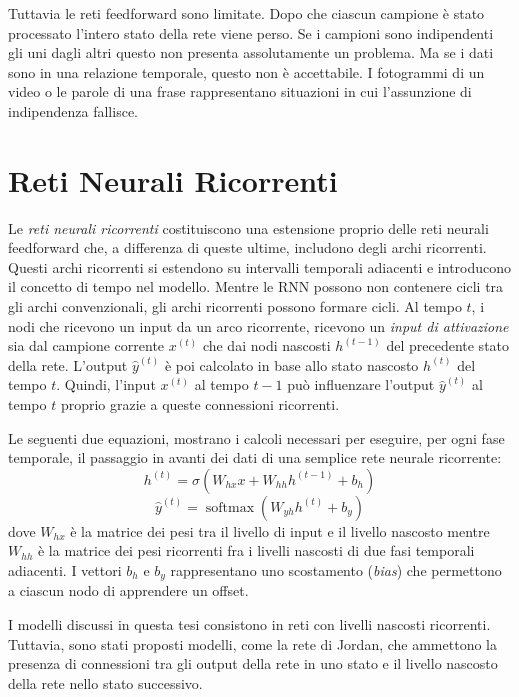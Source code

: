 Tuttavia le reti feedforward sono limitate. Dopo che ciascun campione \`e stato
processato l'intero stato della rete viene perso. Se i campioni sono indipendenti
gli uni dagli altri questo non presenta assolutamente un problema. Ma se i dati
sono in una relazione temporale, questo non \`e accettabile. I fotogrammi di un
video o le parole di una frase rappresentano situazioni in cui l'assunzione di
indipendenza fallisce.

\section{Reti Neurali Ricorrenti}

Le \emph{reti neurali ricorrenti} costituiscono una estensione proprio delle reti
neurali feedforward che, a differenza di queste ultime, includono degli archi ricorrenti.
Questi archi ricorrenti si estendono su intervalli temporali adiacenti e introducono
il concetto di tempo nel modello. Mentre le RNN possono non contenere cicli tra
gli archi convenzionali, gli archi ricorrenti possono formare cicli. Al tempo $t$,
i nodi che ricevono un input da un arco ricorrente, ricevono un \emph{input di
attivazione} sia dal campione corrente $x^{(t)}$ che dai nodi nascosti $h^{(t-1)}$
del precedente stato della rete. L'output $\hat{y}^{(t)}$ \`e poi calcolato in
base allo stato nascosto $h^{(t)}$ del tempo $t$. Quindi, l'input $x^{(t)}$ al
tempo $t-1$ pu\`o influenzare l'output $\hat{y}^{(t)}$ al tempo $t$ proprio grazie
a queste connessioni ricorrenti.

Le seguenti due equazioni, mostrano i calcoli necessari per eseguire, per ogni
fase temporale, il passaggio in avanti dei dati di una semplice rete neurale
ricorrente:
\begin{equation}
  h^{(t)} = \sigma(W_{hx}x + W_{hh}h^{(t-1)} + b_h)
\end{equation}
\begin{equation}
  \hat{y}^{(t)} = \operatorname{softmax}(W_{yh}h^{(t)} + b_y)
\end{equation}
dove $W_{hx}$ \`e la matrice dei pesi tra il livello di input e il livello nascosto
mentre $W_{hh}$ \`e la matrice dei pesi ricorrenti fra i livelli nascosti di due
fasi temporali adiacenti. I vettori $b_h$ e $b_y$ rappresentano uno scostamento
(\emph{bias}) che permettono a ciascun nodo di apprendere un offset.

I modelli discussi in questa tesi consistono in reti con livelli nascosti ricorrenti.
Tuttavia, sono stati proposti modelli, come la rete di Jordan, che ammettono la
presenza di connessioni tra gli output della rete in uno stato e il livello nascosto
della rete nello stato successivo.

